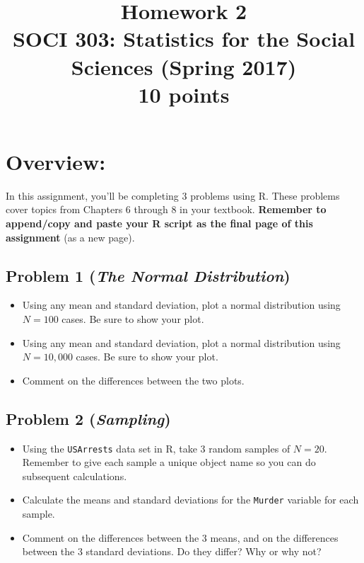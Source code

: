 \documentclass{article}
\begin{document}
\title{Homework 2\\ SOCI 303: Statistics for the Social Sciences (Spring 2017) \\ {\large{10 points}}}
\author[*]{}
\date{}
\maketitle



\section*{Overview:}
In this assignment, you'll be completing 3 problems using R. These problems cover topics from Chapters 6 through 8 in your textbook. \textbf{Remember to append/copy and paste your R script as the final page of this assignment} (as a new page).

\subsection*{Problem 1 (\textit{The Normal Distribution})}
\begin{itemize}
\item Using any mean and standard deviation, plot a normal distribution using $N=100$ cases. Be sure to show your plot.
\item Using any mean and standard deviation, plot a normal distribution using $N=10,000$ cases. Be sure to show your plot.
\item Comment on the differences between the two plots.
\end{itemize}

\subsection*{Problem 2 (\textit{Sampling})}
\begin{itemize}
\item Using the \texttt{USArrests} data set in R, take 3 random samples of $N=20$. Remember to give each sample a unique object name so you can do subsequent calculations.
\item Calculate the means and standard deviations for the \texttt{Murder} variable for each sample.
\item Comment on the differences between the 3 means, and on the differences between the 3 standard deviations. Do they differ? Why or why not?
\end{itemize}
\end{document}
